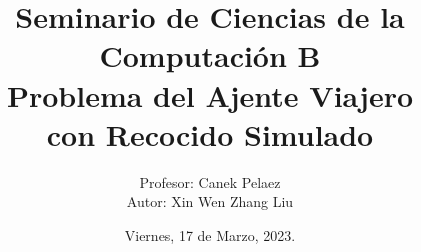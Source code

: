 \documentclass[a4paper]{article}
\title { \Large{Seminario de Ciencias de la Computaci\'on B}\protect\\
  \large{Problema del Ajente Viajero\\con Recocido Simulado}}
\date{\normalsize{Viernes, 17 de Marzo, 2023.}}
\author{\normalsize{Profesor: Canek Pelaez}\protect\\
\normalsize{Autor: Xin Wen Zhang Liu}}\vspace{0.2cm}
\begin{document}
\allowdisplaybreaks
\maketitle
\end{document}
